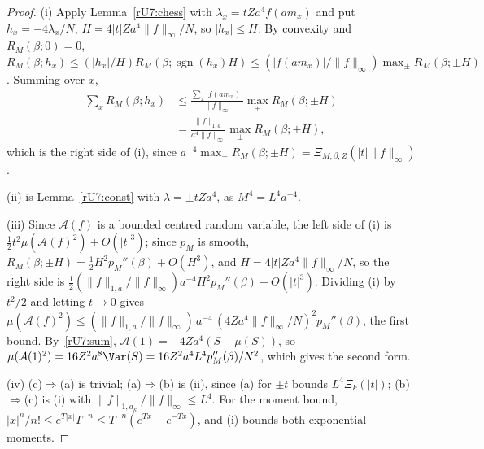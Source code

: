 \begin{proof}
(i) Apply Lemma~\ref{rU7:chess} with $\lambda_x=tZa^4f(am_x)$ and put
$h_x=-4\lambda_x/N$, $H=4|t|Za^4\|f\|_\infty/N$, so $|h_x|\le H$. By
convexity and $R_M(\beta;0)=0$, $R_M(\beta;h_x)\le(|h_x|/H)R_M(\beta;
\operatorname{sgn}(h_x)H)\le(|f(am_x)|/\|f\|_\infty)\max_\pm R_M(\beta;\pm H)$.
Summing over $x$,
\begin{align*}
\sum_xR_M(\beta;h_x)&\le\frac{\sum_x|f(am_x)|}{\|f\|_\infty}\max_\pm R_M(\beta;
\pm H)\\
&=\frac{\|f\|_{1,a}}{a^4\|f\|_\infty}\max_\pm R_M(\beta;\pm H),
\end{align*}
which is the right side of (i), since $a^{-4}\max_\pm R_M(\beta;\pm H)=
\Xi_{M,\beta,Z}(|t|\|f\|_\infty)$.

(ii) is Lemma~\ref{rU7:const} with $\lambda=\pm tZa^4$, as $M^4=L^4a^{-4}$.

(iii) Since $\mathcal A(f)$ is a bounded centred random variable, the left
side of (i) is $\frac12t^2\mu(\mathcal A(f)^2)+O(|t|^3)$; since $p_M$ is
smooth, $R_M(\beta;\pm H)=\frac12H^2p_M''(\beta)+O(H^3)$, and $H=4|t|Za^4
\|f\|_\infty/N$, so the right side is $\frac12(\|f\|_{1,a}/\|f\|_\infty)a^{-4}
H^2p_M''(\beta)+O(|t|^3)$. Dividing (i) by $t^2/2$ and letting $t\to0$ gives
$\mu(\mathcal A(f)^2)\le(\|f\|_{1,a}/\|f\|_\infty)\,a^{-4}\,(4Za^4\|f\|_\infty
/N)^2p_M''(\beta)$, the first bound. By~\eqref{rU7:sum}, $\mathcal A(1)=
-4Za^4(S-\mu(S))$, so $\mu(\mathcal A(1)^2)=16Z^2a^8\Var(S)=16Z^2a^4L^4
p_M''(\beta)/N^2$, which gives the second form.

(iv) (c)$\Rightarrow$(a) is trivial; (a)$\Rightarrow$(b) is (ii), since (a)
for $\pm t$ bounds $L^4\Xi_k(|t|)$; (b)$\Rightarrow$(c) is (i) with
$\|f\|_{1,a_k}/\|f\|_\infty\le L^4$. For the moment bound, $|x|^n/n!\le
e^{T|x|}T^{-n}\le T^{-n}(e^{Tx}+e^{-Tx})$, and (i) bounds both exponential
moments.
\end{proof}

